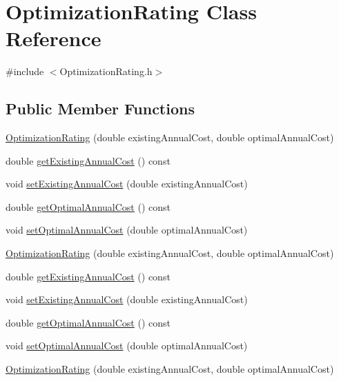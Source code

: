 \hypertarget{class_optimization_rating}{}\section{Optimization\+Rating Class Reference}
\label{class_optimization_rating}


{\ttfamily \#include $<$Optimization\+Rating.\+h$>$}

\subsection*{Public Member Functions}
\begin{DoxyCompactItemize}
\item 
\hyperlink{class_optimization_rating_a775f099775418ff79ae82091f7867c5c}{Optimization\+Rating} (double existing\+Annual\+Cost, double optimal\+Annual\+Cost)
\item 
double \hyperlink{class_optimization_rating_ac6e84aa94642911d089e464aae749ffe}{get\+Existing\+Annual\+Cost} () const
\item 
void \hyperlink{class_optimization_rating_a167d4626ab234baf7facce5fe8e4b32d}{set\+Existing\+Annual\+Cost} (double existing\+Annual\+Cost)
\item 
double \hyperlink{class_optimization_rating_ada9718f5369be2b14b4b0c07d4fa9510}{get\+Optimal\+Annual\+Cost} () const
\item 
void \hyperlink{class_optimization_rating_a4651985a899b2bff18e8356a42c2d37f}{set\+Optimal\+Annual\+Cost} (double optimal\+Annual\+Cost)
\item 
\hyperlink{class_optimization_rating_a775f099775418ff79ae82091f7867c5c}{Optimization\+Rating} (double existing\+Annual\+Cost, double optimal\+Annual\+Cost)
\item 
double \hyperlink{class_optimization_rating_ac6e84aa94642911d089e464aae749ffe}{get\+Existing\+Annual\+Cost} () const
\item 
void \hyperlink{class_optimization_rating_a167d4626ab234baf7facce5fe8e4b32d}{set\+Existing\+Annual\+Cost} (double existing\+Annual\+Cost)
\item 
double \hyperlink{class_optimization_rating_ada9718f5369be2b14b4b0c07d4fa9510}{get\+Optimal\+Annual\+Cost} () const
\item 
void \hyperlink{class_optimization_rating_a4651985a899b2bff18e8356a42c2d37f}{set\+Optimal\+Annual\+Cost} (double optimal\+Annual\+Cost)
\item 
\hyperlink{class_optimization_rating_a775f099775418ff79ae82091f7867c5c}{Optimization\+Rating} (double existing\+Annual\+Cost, double optimal\+Annual\+Cost)

\end{DoxyCompactItemize}
